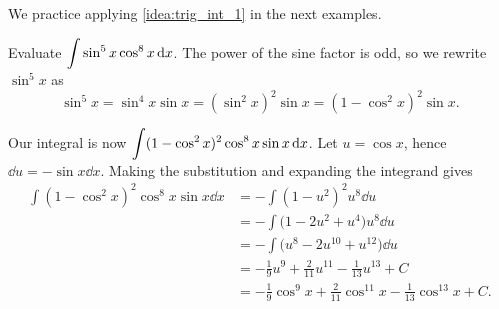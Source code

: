 We practice applying \autoref{idea:trig_int_1} in the next examples.

\begin{example}\label{ex_trigint1}%
Evaluate $\displaystyle\int\sin^5x\cos^8x\operatorname{d}\! x$.
\solution
The power of the sine factor is odd, so we rewrite $\sin^5x$ as
\[\sin^5x = \sin^4x\sin x = (\sin^2x)^2\sin x = (1-\cos^2x)^2\sin x.\]

Our integral is now $\displaystyle \int (1-\cos^2x)^2\cos^8x\sin x\operatorname{d}\! x$. Let $u = \cos x$, hence $\dd u = -\sin x\dd x$. Making the substitution and expanding the integrand gives
\begin{align*}
 \int (1-\cos^2x)^2\cos^8x\sin x\dd x
 &= -\int (1-u^2)^2u^8\dd u \\
 &= -\int \bigl(1-2u^2+u^4\bigr)u^8\dd u \\
 &= -\int \bigl(u^8-2u^{10}+u^{12}\bigr)\dd u \\
 &= -\frac19u^9 + \frac2{11}u^{11} - \frac1{13}u^{13} + C \\
 &=-\frac19\cos^9 x + \frac2{11}\cos^{11} x - \frac1{13}\cos^{13} x + C.
\end{align*}
\end{example}

